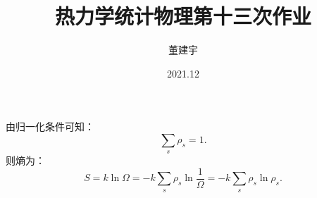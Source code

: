 \documentclass[a4paper,12pt]{article}
\title{热力学统计物理第十三次作业}
\date{2021.12}
\author{董建宇}
\begin{document}
\maketitle 

\titleformat{\section}[hang]{\large}{\thesection}{0.8em}{}{}
\titleformat{\subsection}[hang]{\small}{\thesubsection}{0.8em}{}{}

\section{}
由归一化条件可知：
\begin{equation*}
	\sum_s \rho_s = 1.
\end{equation*}
则熵为：
\begin{equation*}
	S = k \ln\Omega = -k\sum_s \rho_s \ln\frac{1}{\Omega} = -k\sum_s \rho_s\ln\rho_s.
\end{equation*}
\end{document}
